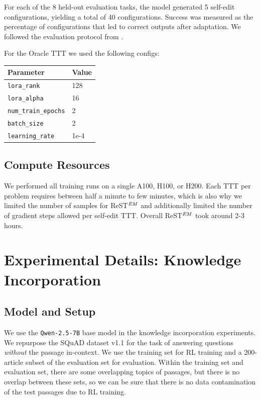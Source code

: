 \documentclass{article}
\begin{document}
For each of the 8 held-out evaluation tasks, the model generated 5 self-edit configurations, yielding a total of 40 configurations. Success was measured as the percentage of configurations that led to correct outputs after adaptation. We followed the evaluation protocol from \citet{akyurek2025TTT}. 

For the Oracle TTT we used the following configs:
\begin{center}
\begin{tabular}{|l|l|}
\hline
\textbf{Parameter} & \textbf{Value} \\
\hline
\texttt{lora\_rank} & 128 \\
\texttt{lora\_alpha} & 16 \\
\texttt{num\_train\_epochs} & 2 \\
\texttt{batch\_size} & 2 \\
\texttt{learning\_rate} & 1e-4 \\
\hline
\end{tabular}
\end{center}


\subsection{Compute Resources}
We performed all training runs on a single A100, H100, or H200. Each TTT per problem requires between half a minute to few minutes, which is also why we limited the number of samples for ReST$^\text{\textit{EM}}$ and additionally limited the number of gradient steps allowed per self-edit TTT. Overall ReST$^\text{\textit{EM}}$ took around 2-3 hours. 

\section{Experimental Details: Knowledge Incorporation}
\label{app:exp_details}

\subsection{Model and Setup}

We use the \texttt{Qwen-2.5-7B} base model \citep{qwen2025qwen25technicalreport} in the knowledge incorporation experiments. We repurpose the SQuAD dataset v1.1 \citep{rajpurkar2016squad} for the task of answering questions \textit{without} the passage in-context. We use the training set for RL training and a 200-article subset of the evaluation set for evaluation. Within the training set and evaluation set, there are some overlapping topics of passages, but there is no overlap between these sets, so we can be sure that there is no data contamination of the test passages due to RL training.
\end{document}
